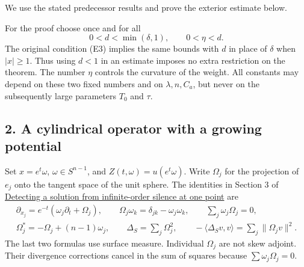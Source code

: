 \documentclass[
  11pt,
]{article}
\makeatletter
\let\ReaderOriginalAnchorStart\hyper@anchorstart
\let\ReaderOriginalAnchorEnd\hyper@anchorend
\let\ReaderPendingAliases\@empty
\def\ReaderArmAliases#1{\gdef\ReaderPendingAliases{#1}}
\def\hyper@anchorstart#1{\ReaderIfNativeAnchorTF{#1}{\ReaderPendingAliases\global\let\ReaderPendingAliases\@empty}{}\ReaderOriginalAnchorStart{#1}}
\makeatother
\begin{document}
We use the stated predecessor results and prove the exterior estimate
below.

For the proof choose once and for all \[
 0<d<\min(\delta,1),\qquad 0<\eta<d.                             \tag{E6}
\] The original condition (E3) implies the same bounds with \(d\) in
place of \(\delta\) when \(|x|\geq1\). Thus using \(d<1\) in an estimate
imposes no extra restriction on the theorem. The number \(\eta\)
controls the curvature of the weight. All constants may depend on these
two fixed numbers and on \(\lambda,n,C_a\), but never on the
subsequently large parameters \(T_0\) and \(\tau\).

\ReaderArmAliases{\ReaderOriginalAnchorStart{AN03-EXU-002}\ReaderOriginalAnchorEnd\begingroup\expandafter\def\csname @currentHref\endcsname{AN03-EXU-002}\label{AN03-EXU-002}\endgroup\ReaderOriginalAnchorStart{an03-exu-002-a-cylindrical-operator-with-a-growing-potential}\ReaderOriginalAnchorEnd\begingroup\expandafter\def\csname @currentHref\endcsname{an03-exu-002-a-cylindrical-operator-with-a-growing-potential}\label{an03-exu-002-a-cylindrical-operator-with-a-growing-potential}\endgroup\ReaderOriginalAnchorStart{2-a-cylindrical-operator-with-a-growing-potential}\ReaderOriginalAnchorEnd\begingroup\expandafter\def\csname @currentHref\endcsname{2-a-cylindrical-operator-with-a-growing-potential}\label{2-a-cylindrical-operator-with-a-growing-potential}\endgroup\ReaderOriginalAnchorStart{a-cylindrical-operator-with-a-growing-potential}\ReaderOriginalAnchorEnd}
\subsection{2. A cylindrical operator with a growing
potential}\label{a-cylindrical-operator-with-a-growing-potential}

Set \(x=e^t\omega\), \(\omega\in S^{n-1}\), and
\(Z(t,\omega)=u(e^t\omega)\). Write \(\Omega_j\) for the projection of
\(e_j\) onto the tangent space of the unit sphere. The identities in
Section 3 of \href{point-unique-continuation.pdf}{Detecting a solution
from infinite-order silence at one point} are \[
\begin{gathered}
 \partial_{x_j}=e^{-t}(\omega_j\partial_t+\Omega_j),\qquad
 \Omega_j\omega_k=\delta_{jk}-\omega_j\omega_k,\qquad
 \sum_j\omega_j\Omega_j=0,\\
 \Omega_j^*=-\Omega_j+(n-1)\omega_j,\qquad
 \Delta_S=\sum_j\Omega_j^2,
 \qquad -\langle\Delta_Sv,v\rangle=\sum_j\|\Omega_jv\|^2.
\end{gathered}                                                    \tag{E7}
\] The last two formulas use surface measure. Individual \(\Omega_j\)
are not skew adjoint. Their divergence corrections cancel in the sum of
squares because \(\sum\omega_j\Omega_j=0\).
\end{document}
